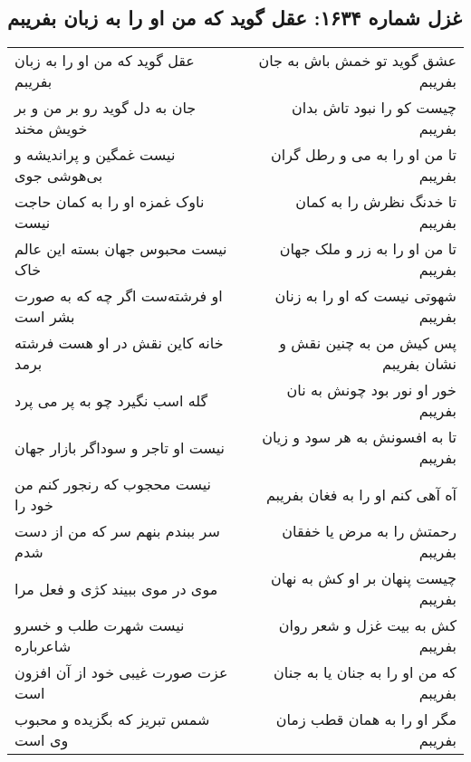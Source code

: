 \begin{center}
\section*{غزل شماره ۱۶۳۴: عقل گوید که من او را به زبان بفریبم}
\label{sec:1634}
\begin{longtable}{l p{0.5cm} r}
عقل گوید که من او را به زبان بفریبم
&&
عشق گوید تو خمش باش به جان بفریبم
\\
جان به دل گوید رو بر من و بر خویش مخند
&&
چیست کو را نبود تاش بدان بفریبم
\\
نیست غمگین و پراندیشه و بی‌هوشی جوی
&&
تا من او را به می و رطل گران بفریبم
\\
ناوک غمزه او را به کمان حاجت نیست
&&
تا خدنگ نظرش را به کمان بفریبم
\\
نیست محبوس جهان بسته این عالم خاک
&&
تا من او را به زر و ملک جهان بفریبم
\\
او فرشته‌ست اگر چه که به صورت بشر است
&&
شهوتی نیست که او را به زنان بفریبم
\\
خانه کاین نقش در او هست فرشته برمد
&&
پس کیش من به چنین نقش و نشان بفریبم
\\
گله اسب نگیرد چو به پر می پرد
&&
خور او نور بود چونش به نان بفریبم
\\
نیست او تاجر و سوداگر بازار جهان
&&
تا به افسونش به هر سود و زیان بفریبم
\\
نیست محجوب که رنجور کنم من خود را
&&
آه آهی کنم او را به فغان بفریبم
\\
سر ببندم بنهم سر که من از دست شدم
&&
رحمتش را به مرض یا خفقان بفریبم
\\
موی در موی ببیند کژی و فعل مرا
&&
چیست پنهان بر او کش به نهان بفریبم
\\
نیست شهرت طلب و خسرو شاعرباره
&&
کش به بیت غزل و شعر روان بفریبم
\\
عزت صورت غیبی خود از آن افزون است
&&
که من او را به جنان یا به جنان بفریبم
\\
شمس تبریز که بگزیده و محبوب وی است
&&
مگر او را به همان قطب زمان بفریبم
\\
\end{longtable}
\end{center}
